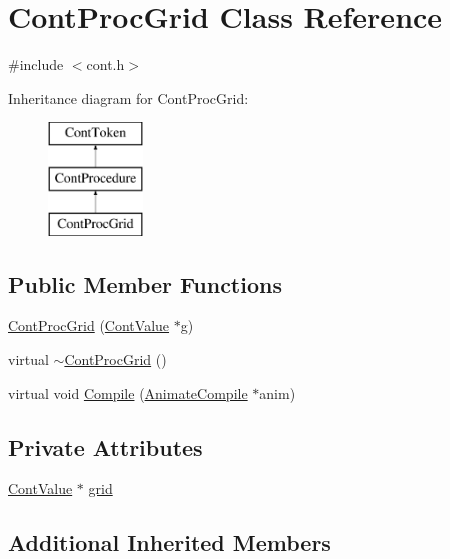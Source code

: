 \hypertarget{a00073}{\section{Cont\-Proc\-Grid Class Reference}
\label{a00073}
}


{\ttfamily \#include $<$cont.\-h$>$}

Inheritance diagram for Cont\-Proc\-Grid\-:\begin{figure}[H]
\begin{center}
\leavevmode
\includegraphics[height=3.000000cm]{a00073}
\end{center}
\end{figure}
\subsection*{Public Member Functions}
\begin{DoxyCompactItemize}
\item 
\hyperlink{a00073_aa959ac7d59e2f73c4e888fb83c93f722}{Cont\-Proc\-Grid} (\hyperlink{a00086}{Cont\-Value} $\ast$g)
\item 
virtual \hyperlink{a00073_a3f9799c12e51407c5fde460378bd4f27}{$\sim$\-Cont\-Proc\-Grid} ()
\item 
virtual void \hyperlink{a00073_a38f567fa3d7142ec6e5ca159e3a7a40d}{Compile} (\hyperlink{a00007}{Animate\-Compile} $\ast$anim)
\end{DoxyCompactItemize}
\subsection*{Private Attributes}
\begin{DoxyCompactItemize}
\item 
\hyperlink{a00086}{Cont\-Value} $\ast$ \hyperlink{a00073_a4a391d2824571c403d454b29b305aa78}{grid}
\end{DoxyCompactItemize}
\subsection*{Additional Inherited Members}


